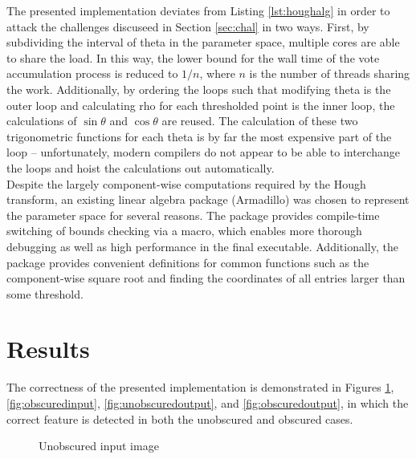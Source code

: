 \documentclass[letterpaper,12pt]{article}
\begin{document}
The presented implementation deviates from Listing \ref{lst:houghalg} in order to attack
the challenges discuseed in Section \ref{sec:chal} in two ways. First, by subdividing the
interval of theta in the parameter space, multiple cores are able to share the load. In this way,
the lower bound for the wall time of the vote accumulation process is reduced to $1/n$, where $n$
is the number of threads sharing the work. Additionally, by ordering the loops such that modifying
theta is the outer loop and calculating rho for each thresholded point is the inner loop, the
calculations of $\sin{\theta}$ and $\cos{\theta}$ are reused. The calculation of these two
trigonometric functions for each theta is by far the most expensive part of the loop\cite{agnerfog2014}
-- unfortunately, modern compilers do not appear to be able to interchange the loops and hoist the
calculations out automatically.
\\
Despite the largely component-wise computations required by the Hough transform, an existing
linear algebra package (Armadillo) was chosen to represent the parameter space for several
reasons. The package provides compile-time switching of bounds checking via a macro, which enables
more thorough debugging as well as high performance in the final executable. Additionally, the
package provides convenient definitions for common functions such as the component-wise square root
and finding the coordinates of all entries larger than some threshold.

\section{Results}
The correctness of the presented implementation is demonstrated in Figures \ref{fig:unobscuredinput},
\ref{fig:obscuredinput}, \ref{fig:unobscuredoutput}, and \ref{fig:obscuredoutput}, in which
the correct feature is detected in both the unobscured and obscured cases.

\begin{figure}[H]
    \caption{Unobscured input image}
    \label{fig:unobscuredinput}
\end{figure}
\end{document}
